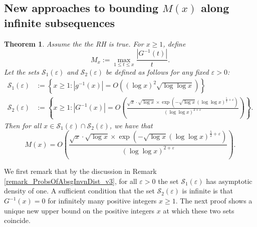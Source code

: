 \documentclass[11pt,reqno,a4letter]{article}
\numberwithin{figure}{section}
\numberwithin{table}{section}
\theoremstyle{plain}
\newtheorem{theorem}{Theorem}
\numberwithin{theorem}{section}
\theoremstyle{definition}
\begin{document}
\subsection{New approaches to bounding $M(x)$ along infinite subsequences} 

\begin{theorem}
\label{theorem_UpperBoundsOnMx_for_SpecialSetIntersections_v1} 
Assume the the RH is true. 
For $x \geq 1$, define 
\[
M_x := \max_{1 \leq t \leq x} \frac{|G^{-1}(t)|}{t}. 
\]
Let the sets $\mathcal{S}_1(\varepsilon)$ and $\mathcal{S}_2(\varepsilon)$ 
be defined as follows for any fixed $\varepsilon > 0$: 
\begin{align*} 
\mathcal{S}_1(\varepsilon) & := \left\{x \geq 1: |g^{-1}(x)| = O((\log x)^2 \sqrt{\log\log x})\right\} \\ 
\mathcal{S}_2(\varepsilon) & := \left\{x \geq 1: |G^{-1}(x)| = O\left( 
     \frac{\sqrt{x} \cdot \sqrt{\log x} \times \exp\left(-\sqrt{\log x} (\log\log x)^{\frac{5}{2} + \varepsilon}\right)}{ 
     (\log\log x)^{2 + \varepsilon}}\right) 
     \right\}. 
\end{align*} 
Then for all $x \in \mathcal{S}_1(\varepsilon) \cap \mathcal{S}_2(\varepsilon)$, we have that 
\[
M(x) = O\left( \frac{\sqrt{x} \cdot \sqrt{\log x} \times \exp\left(-\sqrt{\log x} 
     (\log\log x)^{\frac{5}{2} + \varepsilon}\right)}{ 
     (\log\log x)^{2 + \varepsilon}}
     \right).
\]
\end{theorem}
We first remark that by the discussion in 
Remark \ref{remark_ProbsOfAbsgInvnDist_v3}, 
for all $\varepsilon > 0$ the set $\mathcal{S}_1(\varepsilon)$ has asymptotic density 
of one. A sufficient condition that the set $\mathcal{S}_2(\varepsilon)$ is infinite is that 
$G^{-1}(x) = 0$ for infinitely many positive integers $x \geq 1$. 
The next proof shows a unique new upper bound on the positive integers $x$ at which these two 
sets coincide. 
\end{document}
